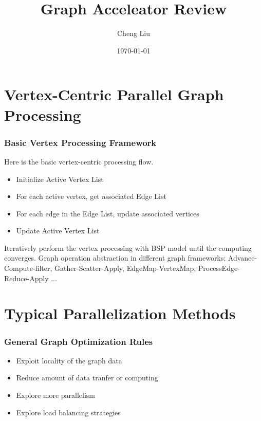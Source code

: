 \documentclass{beamer}
\title[]{Graph Acceleator Review}
\author[]{
    Cheng Liu 
}
\institute {
\medskip
}
\date{\today} %
\begin{document}
\begin{frame}
\titlepage %
\end{frame}


\section{Vertex-Centric Parallel Graph Processing} 
\begin{frame}[t]
\frametitle{Basic Vertex Processing Framework}
    Here is the basic vertex-centric processing flow.
    \begin{itemize}
        \item Initialize Active Vertex List
        \item For each active vertex, get associated Edge List
        \item For each edge in the Edge List, update associated vertices
        \item Update Active Vertex List
    \end{itemize}
    Iteratively perform the vertex processing with BSP model until the computing converges. 
    Graph operation abstraction in different graph frameworks: Advance-Compute-filter,
    Gather-Scatter-Apply, EdgeMap-VertexMap, ProcessEdge-Reduce-Apply ...
\end{frame}

\section{Typical Parallelization Methods}
\begin{frame}[t]
    \frametitle{General Graph Optimization Rules}
    \begin{itemize}
        \item Exploit locality of the graph data
        \item Reduce amount of data tranfer or computing
        \item Explore more parallelism 
        \item Explore load balancing strategies
    \end{itemize}
\end{frame}
\end{document}
